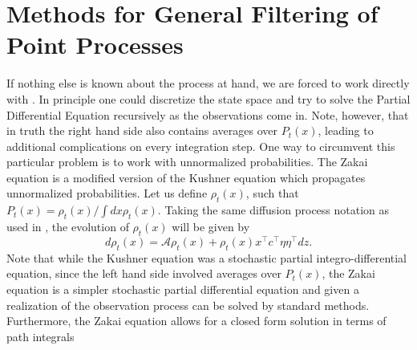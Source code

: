 \section{Methods for General Filtering of Point Processes}

If nothing else is known about the process at hand, we are forced to work directly with . In principle one could discretize the state space and try to solve the Partial Differential Equation recursively as the observations come in. Note, however, that in truth the right hand side  also contains averages over $P_t(x)$, leading to additional complications on every integration step. One way to circumvent this particular problem is to work with unnormalized probabilities. The Zakai equation\cite{Zakai1969} is a modified version of the Kushner equation which propagates unnormalized probabilities. Let us define $\rho_t(x)$, such that $P_t(x) = \rho_t(x)/\int dx \rho_t(x)$. Taking the same diffusion process notation as used in , the evolution of $\rho_t(x)$ will be given by
\begin{equation}
\label{eq:zakai}
d\rho_t(x) = \mathcal{A} \rho_t(x) + \rho_t(x) x^\top c^\top \eta \eta^\top dz.
\end{equation}
Note that while the Kushner equation was a stochastic partial integro-differential equation, since the left hand side involved averages over $P_t(x)$, the Zakai equation is a simpler stochastic partial differential equation and given a realization of the observation process can be solved by standard methods. Furthermore, the Zakai equation allows for a closed form solution in terms of path integrals



